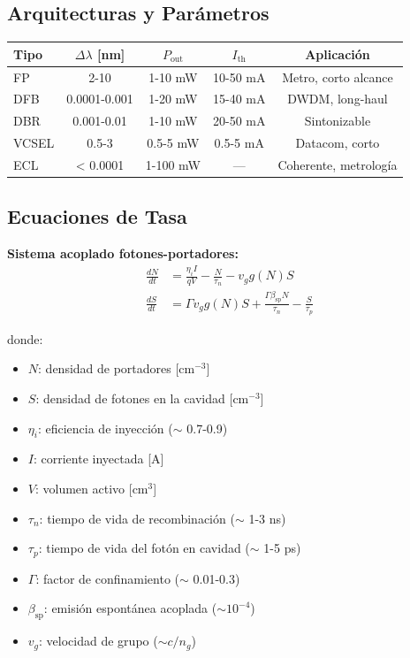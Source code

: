 \documentclass[11pt,a4paper]{article}
\begin{document}
\subsection{Arquitecturas y Parámetros}

\begin{table}[h]
\centering\small
\begin{tabular}{lcccc}
\hline
\textbf{Tipo} & \textbf{$\Delta\lambda$ [nm]} & \textbf{$P_{\text{out}}$} & \textbf{$I_{\text{th}}$} & \textbf{Aplicación} \\
\hline
FP & 2-10 & 1-10 mW & 10-50 mA & Metro, corto alcance \\
DFB & 0.0001-0.001 & 1-20 mW & 15-40 mA & DWDM, long-haul \\
DBR & 0.001-0.01 & 1-10 mW & 20-50 mA & Sintonizable \\
VCSEL & 0.5-3 & 0.5-5 mW & 0.5-5 mA & Datacom, corto \\
ECL & < 0.0001 & 1-100 mW & --- & Coherente, metrología \\
\hline
\end{tabular}
\end{table}

\subsection{Ecuaciones de Tasa}

\textbf{Sistema acoplado fotones-portadores:}
\begin{align}
    \frac{dN}{dt} &= \frac{\eta_i I}{qV} - \frac{N}{\tau_n} - v_g g(N) S \\
    \frac{dS}{dt} &= \Gamma v_g g(N) S + \frac{\Gamma\beta_{\text{sp}}N}{\tau_n} - \frac{S}{\tau_p}
\end{align}

donde:
\begin{itemize}
    \item $N$: densidad de portadores [cm$^{-3}$]
    \item $S$: densidad de fotones en la cavidad [cm$^{-3}$]
    \item $\eta_i$: eficiencia de inyección ($\sim$ 0.7-0.9)
    \item $I$: corriente inyectada [A]
    \item $V$: volumen activo [cm$^3$]
    \item $\tau_n$: tiempo de vida de recombinación ($\sim$ 1-3 ns)
    \item $\tau_p$: tiempo de vida del fotón en cavidad ($\sim$ 1-5 ps)
    \item $\Gamma$: factor de confinamiento ($\sim$ 0.01-0.3)
    \item $\beta_{\text{sp}}$: emisión espontánea acoplada ($\sim 10^{-4}$)
    \item $v_g$: velocidad de grupo ($\sim c/n_g$)
\end{itemize}
\end{document}
